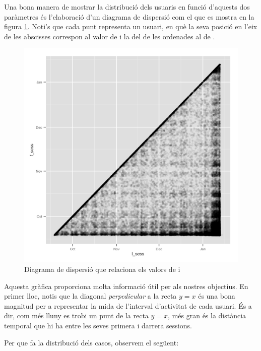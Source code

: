 \documentclass[
	a4paper,
	twoside,
	justified
]{tufte-book}
\begin{document}
Una bona manera de mostrar la distribució dels usuaris en funció d'aquests dos paràmetres és l'elaboració d'un diagrama de dispersió com el que es mostra en la figura \ref{graph:user_first_last_scatter}. Noti's que cada punt representa un usuari, en què la seva posició en l'eix de les abscisses correspon al valor de  i la del de les ordenades al de .  

\begin{figure}
\begin{center}
\includegraphics[width=14cm]{user_first_last_scatter}
\caption{
	\label{graph:user_first_last_scatter}
	Diagrama de dispersió que relaciona els valors de  i 
}
\end{center}
\end{figure}

Aquesta gràfica proporciona molta informació útil per als nostres objectius. En primer lloc, notis que la diagonal \emph{perpedicular} a la recta $y = x$ és una bona magnitud per a representar la mida de l'interval d'activitat de cada usuari. És a dir, com més lluny es trobi un punt de la recta $y  = x$, més gran és la distància temporal que hi ha entre les seves primera i darrera sessions.

Per que fa la distribució dels casos, observem el següent:
\end{document}

